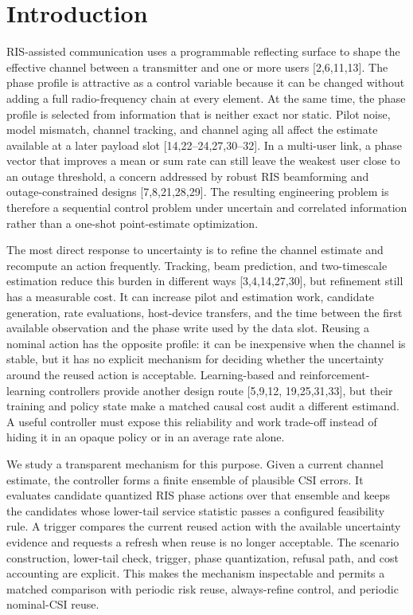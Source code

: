 \documentclass[10pt,twocolumn]{article}
\begin{document}
\section{Introduction}\label{introduction}

RIS-assisted communication uses a programmable reflecting surface to
shape the effective channel between a transmitter and one or more users
{[}2,6,11,13{]}. The phase profile is attractive as a control variable
because it can be changed without adding a full radio-frequency chain at
every element. At the same time, the phase profile is selected from
information that is neither exact nor static. Pilot noise, model
mismatch, channel tracking, and channel aging all affect the estimate
available at a later payload slot {[}14,22--24,27,30--32{]}. In a
multi-user link, a phase vector that improves a mean or sum rate can
still leave the weakest user close to an outage threshold, a concern
addressed by robust RIS beamforming and outage-constrained designs
{[}7,8,21,28,29{]}. The resulting engineering problem is therefore a
sequential control problem under uncertain and correlated information
rather than a one-shot point-estimate optimization.

The most direct response to uncertainty is to refine the channel
estimate and recompute an action frequently. Tracking, beam prediction,
and two-timescale estimation reduce this burden in different ways
{[}3,4,14,27,30{]}, but refinement still has a measurable cost. It can
increase pilot and estimation work, candidate generation, rate
evaluations, host-device transfers, and the time between the first
available observation and the phase write used by the data slot. Reusing
a nominal action has the opposite profile: it can be inexpensive when
the channel is stable, but it has no explicit mechanism for deciding
whether the uncertainty around the reused action is acceptable.
Learning-based and reinforcement-learning controllers provide another
design route {[}5,9,12, 19,25,31,33{]}, but their training and policy
state make a matched causal cost audit a different estimand. A useful
controller must expose this reliability and work trade-off instead of
hiding it in an opaque policy or in an average rate alone.

We study a transparent mechanism for this purpose. Given a current
channel estimate, the controller forms a finite ensemble of plausible
CSI errors. It evaluates candidate quantized RIS phase actions over that
ensemble and keeps the candidates whose lower-tail service statistic
passes a configured feasibility rule. A trigger compares the current
reused action with the available uncertainty evidence and requests a
refresh when reuse is no longer acceptable. The scenario construction,
lower-tail check, trigger, phase quantization, refusal path, and cost
accounting are explicit. This makes the mechanism inspectable and
permits a matched comparison with periodic risk reuse, always-refine
control, and periodic nominal-CSI reuse.
\end{document}

